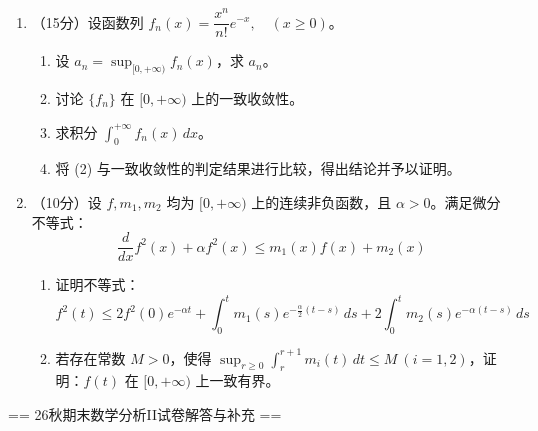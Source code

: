 \begin{enumerate}
\begin{enumerate}[label=\arabic*.]
\item （15分）设函数列 $f_n(x) = \dfrac{x^n}{n!} e^{-x}, \quad (x \ge 0)$。
\begin{enumerate}[label=(\arabic*)]
\item 设 $a_n = \sup_{[0, +\infty)} f_n(x)$，求 $a_n$。
\item 讨论 $\{f_n\}$ 在 $[0, +\infty)$ 上的一致收敛性。
\item 求积分 $\displaystyle \int_0^{+\infty} f_n(x) \, dx$。
\item 将 (2) 与一致收敛性的判定结果进行比较，得出结论并予以证明。
\end{enumerate}

\item （10分）设 $f, m_1, m_2$ 均为 $[0, +\infty)$ 上的连续非负函数，且 $\alpha > 0$。满足微分不等式：
\[
\frac{d}{dx} f^2(x) + \alpha f^2(x) \le m_1(x) f(x) + m_2(x)
\]
\begin{enumerate}[label=(\arabic*)]
\item 证明不等式：
\[
f^2(t) \le 2 f^2(0) e^{-\alpha t} + \int_0^t m_1(s) e^{-\frac{\alpha}{2}(t-s)} \, ds + 2 \int_0^t m_2(s) e^{-\alpha(t-s)} \, ds
\]
\item 若存在常数 $M > 0$，使得 $\displaystyle \sup_{r \ge 0} \int_r^{r+1} m_i(t) \, dt \le M \ (i=1, 2)$，证明：$f(t)$ 在 $[0, +\infty)$ 上一致有界。
\end{enumerate}
\end{enumerate}
\end{enumerate}

== 26秋期末数学分析II试卷解答与补充 ==

